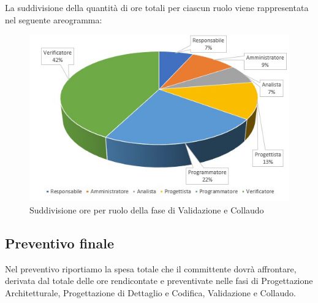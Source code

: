 La suddivisione della quantità di ore totali per ciascun ruolo viene rappresentata nel seguente areogramma:

\begin{figure}[h]
	\centering
	
	\includegraphics[scale=2.4	]{Sezioni/Aerogrammi/AerogrammaValidazione.png}
	\caption{Suddivisione ore per ruolo della fase di Validazione e Collaudo}
\end{figure}


\clearpage
\subsection{Preventivo finale} 
Nel preventivo riportiamo la spesa totale che il committente dovrà affrontare, derivata dal totale delle ore rendicontate e preventivate nelle fasi di Progettazione Architetturale, Progettazione di Dettaglio e Codifica, Validazione e Collaudo.

